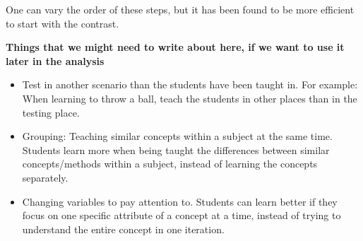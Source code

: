 One can vary the order of these steps, but it has been found to be more 
efficient to start with the contrast.

\textbf{Things that we might need to write about here, if we want to use it 
later in the analysis}

\begin{itemize}
    \item Test in another scenario than the students have been taught in. 
For example: When learning to throw a ball, teach the students in other 
places than in the testing place.
    \item Grouping: Teaching similar concepts within a subject at the same 
time. Students learn more when being taught the differences between 
similar concepts/methods within a subject, instead of learning the 
concepts separately.
    \item Changing variables to pay attention to. Students can learn better 
if they focus on one specific attribute of a concept at a time, instead 
of trying to understand the entire concept in one iteration.
\end{itemize}








